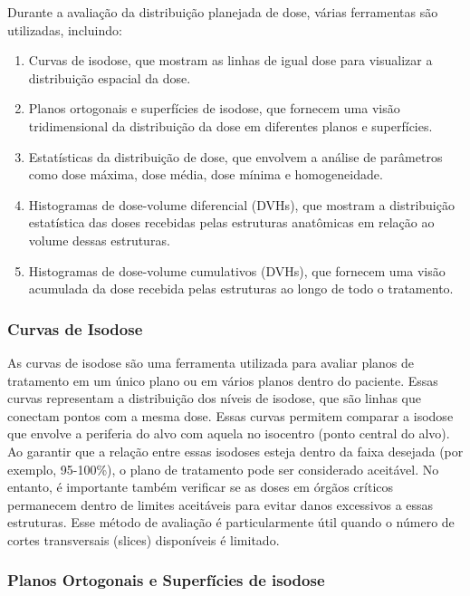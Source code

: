 \documentclass[11pt,a4paper]{article}
\newcounter{exemplo}
\begin{document}
	Durante a avaliação da distribuição planejada de dose, várias ferramentas são utilizadas, incluindo:

	\begin{enumerate}[label=\textcolor{CarnationPink}{(\roman*)}]
		\item Curvas de isodose, que mostram as linhas de igual dose para visualizar a distribuição espacial da dose.
		\item Planos ortogonais e superfícies de isodose, que fornecem uma visão tridimensional da distribuição da dose em diferentes planos e superfícies.
		\item Estatísticas da distribuição de dose, que envolvem a análise de parâmetros como dose máxima, dose média, dose mínima e homogeneidade.
		\item Histogramas de dose-volume diferencial (DVHs), que mostram a distribuição estatística das doses recebidas pelas estruturas anatômicas em relação ao volume dessas estruturas.
		\item Histogramas de dose-volume cumulativos (DVHs), que fornecem uma visão acumulada da dose recebida pelas estruturas ao longo de todo o tratamento.
	\end{enumerate}

\subsubsection*{Curvas de Isodose}

	As curvas de isodose são uma ferramenta utilizada para avaliar planos de tratamento em um único plano ou em vários planos dentro do paciente. Essas curvas representam a distribuição dos níveis de isodose, que são linhas que conectam pontos com a mesma dose. Essas curvas permitem comparar a isodose que envolve a periferia do alvo com aquela no isocentro (ponto central do alvo). Ao garantir que a relação entre essas isodoses esteja dentro da faixa desejada (por exemplo, 95-100\%), o plano de tratamento pode ser considerado aceitável. No entanto, é importante também verificar se as doses em órgãos críticos permanecem dentro de limites aceitáveis para evitar danos excessivos a essas estruturas. Esse método de avaliação é particularmente útil quando o número de cortes transversais (slices) disponíveis é limitado.

\subsubsection*{Planos Ortogonais e Superfícies de isodose}
\end{document}
